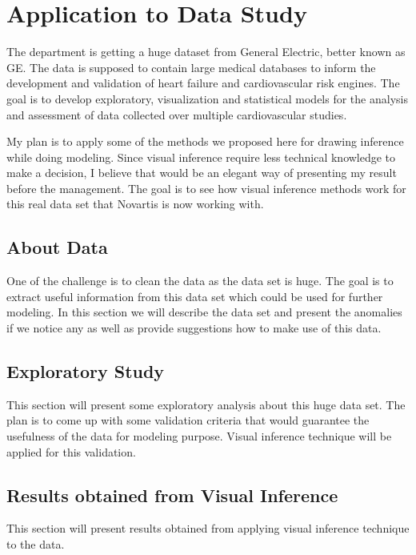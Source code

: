 
\chapter{Application to Data Study} \label{ch:application} The department is getting a huge dataset from General Electric, better known as GE. The data is supposed to contain large medical databases to inform the development and validation of heart failure and cardiovascular risk engines. The goal is to develop exploratory, visualization and statistical models for the analysis and assessment of data collected over multiple cardiovascular studies. 

My plan is to apply some of the methods we proposed here for drawing inference while doing modeling. Since visual inference require less technical knowledge to make a decision, I believe that would be an elegant way of presenting my result before the management. The goal is to see how visual inference methods work for this real data set that Novartis is now working with. 

\section{About Data} One of the challenge is to clean the data as the data set is huge. The goal is to extract useful information from this data set which could be used for further modeling. In this section we will describe the data set and present the anomalies if we notice any as well as provide suggestions how to make use of this data.

\section{Exploratory Study} This section will present some exploratory analysis about this huge data set. The plan is to come up with some validation criteria that would guarantee the usefulness of the data for modeling purpose. Visual inference technique will be applied for this validation.

\section{Results obtained from Visual Inference} This section will present results obtained from applying visual inference technique to the data.%
